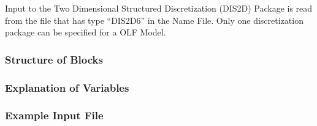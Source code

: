 Input to the Two Dimensional Structured Discretization (DIS2D) Package is read from the file that has type ``DIS2D6'' in the Name File.  Only one discretization package can be specified for a OLF Model.


\vspace{5mm}
\subsubsection{Structure of Blocks}




\vspace{5mm}
\subsubsection{Explanation of Variables}
\begin{description}

\end{description}

\vspace{5mm}
\subsubsection{Example Input File}

